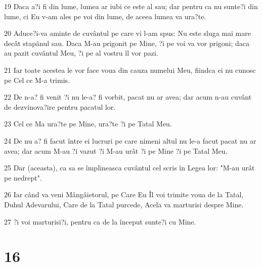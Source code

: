\par 19 Daca a?i fi din lume, lumea ar iubi ce este al sau; dar pentru ca nu sunte?i din lume, ci Eu v-am ales pe voi din lume, de aceea lumea va ura?te.
\par 20 Aduce?i-va aminte de cuvântul pe care vi l-am spus: Nu este sluga mai mare decât stapânul sau. Daca M-au prigonit pe Mine, ?i pe voi va vor prigoni; daca au pazit cuvântul Meu, ?i pe al vostru îl vor pazi.
\par 21 Iar toate acestea le vor face voua din cauza numelui Meu, fiindca ei nu cunosc pe Cel ce M-a trimis.
\par 22 De n-a? fi venit ?i nu le-a? fi vorbit, pacat nu ar avea; dar acum n-au cuvânt de dezvinova?ire pentru pacatul lor.
\par 23 Cel ce Ma ura?te pe Mine, ura?te ?i pe Tatal Meu.
\par 24 De nu a? fi facut între ei lucruri pe care nimeni altul nu le-a facut pacat nu ar avea; dar acum M-au ?i vazut ?i M-au urât ?i pe Mine ?i pe Tatal Meu.
\par 25 Dar (aceasta), ca sa se împlineasca cuvântul cel scris în Legea lor: "M-au urât pe nedrept".
\par 26 Iar când va veni Mângâietorul, pe Care Eu Îl voi trimite voua de la Tatal, Duhul Adevarului, Care de la Tatal purcede, Acela va marturisi despre Mine.
\par 27 ?i voi marturisi?i, pentru ca de la început sunte?i cu Mine.

\chapter{16}

